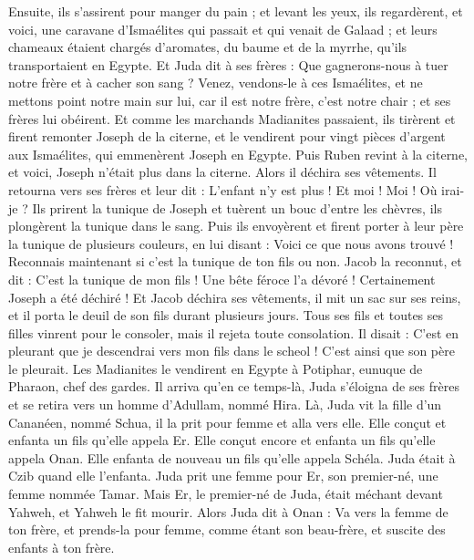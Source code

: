 \begin{multicols}{2}
Ensuite, ils s'assirent pour manger du pain ; et levant les yeux, ils regardèrent, et voici, une caravane d'Ismaélites qui passait et qui venait de Galaad ; et leurs chameaux étaient chargés d'aromates, du baume et de la myrrhe, qu'ils transportaient en Egypte.
Et Juda dit à ses frères : Que gagnerons-nous à tuer notre frère et à cacher son sang ?
Venez, vendons-le à ces Ismaélites, et ne mettons point notre main sur lui, car il est notre frère, c'est notre chair ; et ses frères lui obéirent.
Et comme les marchands Madianites passaient, ils tirèrent et firent remonter Joseph de la citerne, et le vendirent pour vingt pièces d'argent aux Ismaélites, qui emmenèrent Joseph en Egypte.
Puis Ruben revint à la citerne, et voici, Joseph n'était plus dans la citerne. Alors il déchira ses vêtements.
Il retourna vers ses frères et leur dit : L'enfant n'y est plus ! Et moi ! Moi ! Où irai-je ?
Ils prirent la tunique de Joseph et tuèrent un bouc d'entre les chèvres, ils plongèrent la tunique dans le sang.
Puis ils envoyèrent et firent porter à leur père la tunique de plusieurs couleurs, en lui disant : Voici ce que nous avons trouvé ! Reconnais maintenant si c'est la tunique de ton fils ou non.
Jacob la reconnut, et dit : C'est la tunique de mon fils ! Une bête féroce l'a dévoré ! Certainement Joseph a été déchiré !
Et Jacob déchira ses vêtements, il mit un sac sur ses reins, et il porta le deuil de son fils durant plusieurs jours.
Tous ses fils et toutes ses filles vinrent pour le consoler, mais il rejeta toute consolation. Il disait : C'est en pleurant que je descendrai vers mon fils dans le scheol ! C'est ainsi que son père le pleurait.
Les Madianites le vendirent en Egypte à Potiphar, eunuque de Pharaon, chef des gardes.
\VerseOne{}Il arriva qu'en ce temps-là, Juda s'éloigna de ses frères et se retira vers un homme d'Adullam, nommé Hira.
Là, Juda vit la fille d'un Cananéen, nommé Schua, il la prit pour femme et alla vers elle.
Elle conçut et enfanta un fils qu'elle appela Er.
Elle conçut encore et enfanta un fils qu'elle appela Onan.
Elle enfanta de nouveau un fils qu'elle appela Schéla. Juda était à Czib quand elle l'enfanta.
Juda prit une femme pour Er, son premier-né, une femme nommée Tamar.
Mais Er, le premier-né de Juda, était méchant devant Yahweh, et Yahweh le fit mourir.
Alors Juda dit à Onan : Va vers la femme de ton frère, et prends-la pour femme, comme étant son beau-frère, et suscite des enfants à ton frère.

\end{multicols}
